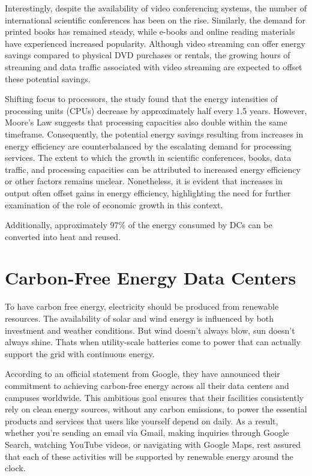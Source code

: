 \documentclass[
  a4paper,  %
  twoside,  %
  bibliography=totoc,
  headsepline,
  cleardoublepage=empty,
  parskip=half,
  draft=false
]{scrbook}
\begin{document}
Interestingly, despite the availability of video conferencing systems\cite{lange2020digitalization}, the number of international scientific conferences has been on the rise. Similarly, the demand for printed books has remained steady, while e-books and online reading materials have experienced increased popularity. Although video streaming can offer energy savings compared to physical DVD purchases or rentals, the growing hours of streaming and data traffic associated with video streaming are expected to offset these potential savings.

Shifting focus to processors, the study found that the energy intensities of processing units (CPUs) decrease by approximately half every 1.5 years\cite{lange2020digitalization}. However, Moore's Law\cite{schaller1997moore} suggests that processing capacities also double within the same timeframe. Consequently, the potential energy savings resulting from increases in energy efficiency are counterbalanced by the escalating demand for processing services. The extent to which the growth in scientific conferences, books, data traffic, and processing capacities can be attributed to increased energy efficiency or other factors remains unclear. Nonetheless, it is evident that increases in output often offset gains in energy efficiency, highlighting the need for further examination of the role of economic growth in this context.

Additionally, approximately 97\% of the energy consumed by DCs can be converted into heat and reused\cite{distributed_head}.

\section{Carbon-Free Energy Data Centers}

To have carbon free energy, electricity should be produced from renewable resources. The availability of solar and wind energy is influenced by both investment and weather conditions. But wind doesn't always blow, sun doesn't always shine. Thats when utility-scale batteries come to power that can actually support the grid with continuous energy.

According to an official statement from Google, they have announced their commitment to achieving carbon-free energy across all their data centers and campuses worldwide. This ambitious goal ensures that their facilities consistently rely on clean energy sources, without any carbon emissions, to power the essential products and services that users like yourself depend on daily. As a result, whether you're sending an email via Gmail, making inquiries through Google Search, watching YouTube videos, or navigating with Google Maps, rest assured that each of these activities will be supported by renewable energy around the clock\cite{google2020thirddecade}.
\end{document}
